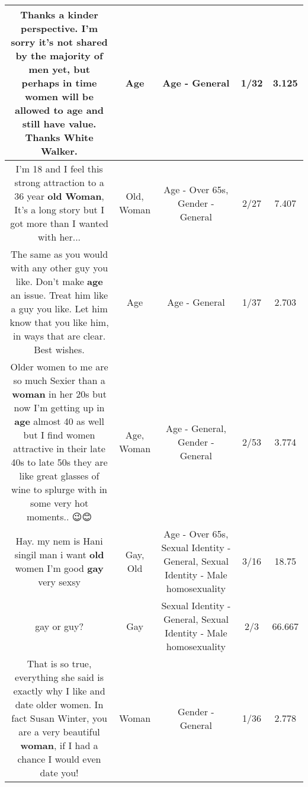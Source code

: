 \documentclass[11pt]{article}
\newlength\mylength
\begin{document}
\begin{center}
\begin{longtable}{|C{.65\mylength}|C{.30\mylength}|C{.12\mylength}|C{.12\mylength}|C{.12\mylength}|}
  \small Thanks a kinder perspective. I'm sorry it's not shared by the majority of men yet, but perhaps in time women will be allowed to \textbf{age} and still have value. Thanks White Walker.\normalsize   & Age & Age - General & 1/32 & 3.125 \\  \hline
  \small I'm 18 and I feel this strong attraction to a 36 year \textbf{old} \textbf{Woman}, It's a long story but I got more than I wanted with her...\normalsize   & Old, Woman & Age - Over 65s, Gender - General & 2/27 & 7.407 \\  \hline
  \small The same as you would with any other guy you like. Don't make \textbf{age} an issue. Treat him like a guy you like. Let him know that you like him, in ways that are clear. Best wishes.\normalsize   & Age & Age - General & 1/37 & 2.703 \\  \hline
  \small Older women to me are so much Sexier than a \textbf{woman} in her 20s but now I'm getting up in \textbf{age} almost 40 as well but I find women attractive in their late 40s to late 50s they are like great glasses of wine to splurge with in some very hot moments.. 😉😊\normalsize   & Age, Woman & Age - General, Gender - General & 2/53 & 3.774 \\  \hline
  \small Hay. my nem is Hani singil man i want \textbf{old} women I'm good \textbf{g\textbf{ay}} very sexsy\normalsize   & Gay, Old & Age - Over 65s, Sexual Identity - General, Sexual Identity - Male homosexuality & 3/16 & 18.75 \\  \hline
  \small gay or guy?\normalsize   & Gay & Sexual Identity - General, Sexual Identity - Male homosexuality & 2/3 & 66.667 \\  \hline
  \small That is so true, everything she said is exactly why I like and date older women. In fact Susan Winter, you are a very beautiful \textbf{woman}, if I had a chance I would even date you!\normalsize   & Woman & Gender - General & 1/36 & 2.778 \\  \hline

\end{longtable}
\end{center}
\end{document}
